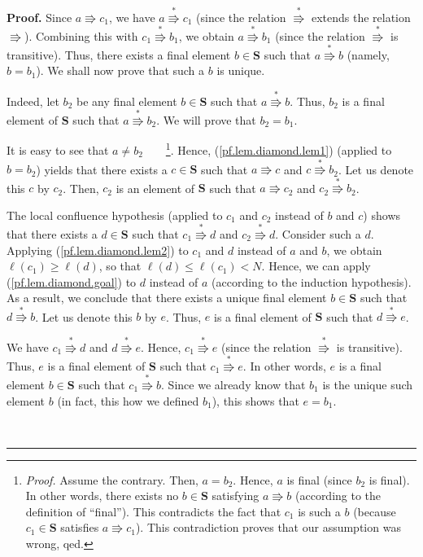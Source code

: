 \documentclass[numbers=enddot,12pt,final,onecolumn,notitlepage]{scrartcl}%
\theoremstyle{definition}
\newenvironment{proof}[1][Proof]{\noindent\textbf{#1.} }{\ \rule{0.5em}{0.5em}}
\begin{document}
\begin{proof}
Since $a\Rrightarrow c_{1}$, we have $a\overset{\ast}{\Rrightarrow}c_{1}$
(since the relation $\overset{\ast}{\Rrightarrow}$ extends the relation
$\Rrightarrow$). Combining this with $c_{1}\overset{\ast}{\Rrightarrow}b_{1}$,
we obtain $a\overset{\ast}{\Rrightarrow}b_{1}$ (since the relation
$\overset{\ast}{\Rrightarrow}$ is transitive). Thus, there exists a final
element $b\in\mathbf{S}$ such that $a\overset{\ast}{\Rrightarrow}b$ (namely,
$b=b_{1}$). We shall now prove that such a $b$ is unique.

Indeed, let $b_{2}$ be any final element $b\in\mathbf{S}$ such that
$a\overset{\ast}{\Rrightarrow}b$. Thus, $b_{2}$ is a final element of
$\mathbf{S}$ such that $a\overset{\ast}{\Rrightarrow}b_{2}$. We will prove
that $b_{2}=b_{1}$.

It is easy to see that $a\neq b_{2}$\ \ \ \ \footnote{\textit{Proof.} Assume
the contrary. Then, $a=b_{2}$. Hence, $a$ is final (since $b_{2}$ is final).
In other words, there exists no $b\in\mathbf{S}$ satisfying $a\Rrightarrow b$
(according to the definition of \textquotedblleft final\textquotedblright).
This contradicts the fact that $c_{1}$ is such a $b$ (because $c_{1}%
\in\mathbf{S}$ satisfies $a\Rrightarrow c_{1}$). This contradiction proves
that our assumption was wrong, qed.}. Hence, (\ref{pf.lem.diamond.lem1})
(applied to $b=b_{2}$) yields that there exists a $c\in\mathbf{S}$ such that
$a\Rrightarrow c$ and $c\overset{\ast}{\Rrightarrow}b_{2}$. Let us denote this
$c$ by $c_{2}$. Then, $c_{2}$ is an element of $\mathbf{S}$ such that
$a\Rrightarrow c_{2}$ and $c_{2}\overset{\ast}{\Rrightarrow}b_{2}$.

The local confluence hypothesis (applied to $c_{1}$ and $c_{2}$ instead of $b$
and $c$) shows that there exists a $d\in\mathbf{S}$ such that $c_{1}%
\overset{\ast}{\Rrightarrow}d$ and $c_{2}\overset{\ast}{\Rrightarrow}d$.
Consider such a $d$. Applying (\ref{pf.lem.diamond.lem2}) to $c_{1}$ and $d$
instead of $a$ and $b$, we obtain $\ell\left(  c_{1}\right)  \geq\ell\left(
d\right)  $, so that $\ell\left(  d\right)  \leq\ell\left(  c_{1}\right)  <N$.
Hence, we can apply (\ref{pf.lem.diamond.goal}) to $d$ instead of $a$
(according to the induction hypothesis). As a result, we conclude that there
exists a unique final element $b\in\mathbf{S}$ such that $d\overset{\ast
}{\Rrightarrow}b$. Let us denote this $b$ by $e$. Thus, $e$ is a final element
of $\mathbf{S}$ such that $d\overset{\ast}{\Rrightarrow}e$.

We have $c_{1}\overset{\ast}{\Rrightarrow}d$ and $d\overset{\ast
}{\Rrightarrow}e$. Hence, $c_{1}\overset{\ast}{\Rrightarrow}e$ (since the
relation $\overset{\ast}{\Rrightarrow}$ is transitive). Thus, $e$ is a final
element of $\mathbf{S}$ such that $c_{1}\overset{\ast}{\Rrightarrow}e$. In
other words, $e$ is a final element $b\in\mathbf{S}$ such that $c_{1}%
\overset{\ast}{\Rrightarrow}b$. Since we already know that $b_{1}$ is the
unique such element $b$ (in fact, this how we defined $b_{1}$), this shows
that $e=b_{1}$.


\end{proof}
\end{document}
